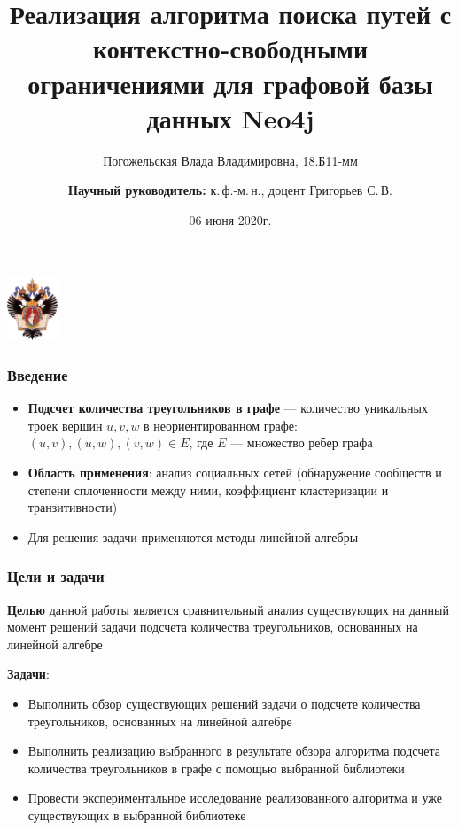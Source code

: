 \documentclass{beamer}
\title[]{Реализация алгоритма поиска путей с контекстно-свободными ограничениями для графовой
базы данных Neo4j}
\institute[СПбГУ]{
Санкт-Петербургский государственный университет \\
Кафедра системного программирования }
\author[Погожельская Влада]{Погожельская Влада Владимировна, 18.Б11-мм \\
  \and  
    {\bfseries Научный руководитель:} к.\,ф.-м.\,н., доцент Григорьев С.\,В. \\ 
}
\date{06 июня 2020г.}
\begin{document}
{
\begin{frame}
  \begin{center}
  {\includegraphics[width=1.5cm]{pictures/SPbGU_Logo.png}}
  \end{center}
  \titlepage
\end{frame}
}

\begin{frame}[fragile]
  \transwipe[direction=90]
  \frametitle{Введение}
  \begin{itemize}
    \item \textbf{Подсчет количества треугольников в графе} --- количество уникальных троек вершин $u, v, w$ в неориентированном графе: $(u, v), (u, w), (v, w) \in E$, где $E$ --- множество ребер графа
    \item \textbf{Область применения}: анализ социальных сетей (обнаружение сообществ и степени сплоченности между ними, коэффициент кластеризации и транзитивности)
    \item Для решения задачи применяются методы линейной алгебры
  \end{itemize}
\end{frame}

\begin{frame}
  \transwipe[direction=90]
  \frametitle{Цели и задачи}
  \textbf{Целью} данной работы является сравнительный анализ существующих на данный момент решений задачи подсчета количества треугольников, основанных на линейной алгебре
  
  \textbf{Задачи}:
  \begin{itemize}
    \item Выполнить обзор существующих решений задачи о подсчете количества треугольников, основанных на линейной алгебре
    \item Выполнить реализацию выбранного в результате обзора алгоритма подсчета количества треугольников в графе с помощью выбранной библиотеки
    \item Провести экспериментальное исследование реализованного алгоритма и уже существующих в выбранной библиотеке
  \end{itemize}
\end{frame}
\end{document}
